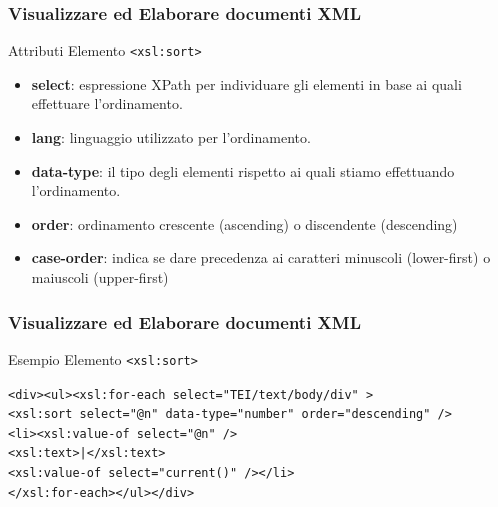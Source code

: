 \begin{frame}
    \frametitle{Visualizzare ed Elaborare documenti XML}
    \addtocounter{nframe}{1}
    

     \begin{block}{Attributi Elemento \texttt{<xsl:sort>}}
         \begin{itemize}
             \item \textbf{select}: espressione XPath per individuare gli elementi in base ai quali effettuare l’ordinamento.
             \item \textbf{lang}: linguaggio utilizzato per l’ordinamento.
             \item \textbf{data-type}: il tipo degli elementi rispetto ai quali stiamo effettuando l’ordinamento.
             \item \textbf{order}: ordinamento crescente (ascending) o discendente (descending)
             \item \textbf{case-order}: indica se dare precedenza ai caratteri minuscoli (lower-first) o maiuscoli (upper-first)
        \end{itemize}
     \end{block}
    
\end{frame}

\begin{frame}
    \frametitle{Visualizzare ed Elaborare documenti XML}
    \addtocounter{nframe}{1}
    

     \begin{block}{Esempio Elemento \texttt{<xsl:sort>}}
        
        \texttt{<div><ul><xsl:for-each select="TEI/text/body/div" >}
        \\\texttt{<xsl:sort select="@n" data-type="number" order="descending" />}
        \\\texttt{<li><xsl:value-of select="@n" />}
        \\\texttt{<xsl:text>|</xsl:text>}
        \\\texttt{<xsl:value-of select="current()" /></li>}
        \\\texttt{</xsl:for-each></ul></div>}

     \end{block}
\end{frame}

